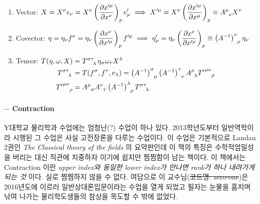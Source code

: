 \documentclass[paper=a4, fontsize=11pt]{scrartcl} %
\numberwithin{equation}{section} %
\numberwithin{figure}{section} %
\numberwithin{table}{section} %
\theoremstyle{plain}
\newcommand{\Hs}{\hspace{0.1cm}}
\newcommand{\PD}[2]{\frac{\partial #1}{\partial #2}}
\newcommand{\BKS}[1]{\left( #1 \right)}
\begin{document}
\begin{enumerate}
 \item Vector: \Hs $\begin{aligned}[t]
                     X = X^{\nu}e_{\nu} = X^{\nu} \BKS{\PD{x'^{\mu}}{x^{\nu}}}_p e'_\mu \Hs \Longrightarrow \Hs X'^{\mu} = X^{\nu}\BKS{\PD{x'^{\mu}}{x^{\mu}}}_p \equiv \tensor{A}{^\mu _\nu}X^{\nu}
                    \end{aligned}$
 \item Covector: \Hs $\begin{aligned}[t]
                       \eta = \eta_{\nu} f^{\nu} = \eta_{\nu} \BKS{\PD{x^{\nu}}{x'^{\mu}}}_p f'^{\mu} \Hs \Longrightarrow \Hs \eta'_{\mu} = \eta_{\nu} \BKS{\PD{x^{\nu}}{x'^{\mu}}}_p \equiv \tensor{\BKS{A^{-1}}}{^\nu _\mu}\eta_{\nu}
                      \end{aligned}$
 \item Tensor: \Hs $\begin{aligned}[t]
                     T(\eta,\omega,X) & = \tensor{T}{^\sigma^\tau_\lambda} \eta_\sigma \omega_{\tau} X^{\lambda}\\
                     \tensor{T}{^\sigma ^\tau _\lambda} & = T(f^\sigma, f^\tau,e_\lambda) = \tensor{\BKS{A^{-1}}}{^\sigma _\mu} \tensor{\BKS{A^{-1}}}{^\tau _\nu} \tensor{A}{^\rho _\lambda} \tensor{{T'}}{ ^\mu ^\nu _\rho} \\
                     \tensor{{T'}}{^\mu ^\nu _\rho} & = \tensor{A}{^\mu _\sigma} \tensor{A}{^\nu _\tau} \tensor{\BKS{A^{-1}}}{^\lambda _\rho} \tensor{T}{^\sigma^\tau_\lambda} 
                    \end{aligned}$


\end{enumerate}


\paragraph{$-$ Contraction}

Y대학교 물리학과 수업에는 엄청난(?) 수업이 하나 있다. 2013학년도부터 일반역학이라 시행된 그 수업은 사실 고전장론을 다루는 수업이다.\footnotemark
{}
이 수업은 기본적으로 Landau 2권인 \emph{The Classical theory of the fields} 의 요약판인데 이 책의 특징은 수학적엄밀성을 버리는 대신 직관에 치중하자 이기에 
쉽지만 찜찜함이 남는 책이다. 이 책에서는 Contraction 이란 \textit{upper index와 동일한 lower index가 만나면 rank가 하나 내려가게 되는 것} 이다. 실로 찜찜하지 않을 수 없다.
여담으로 이 교수님(\sout{코드명: zero-one})은 2016년도에 이르러 일반상대론입문이라는 수업을 열게 되었고 필자는 눈물을 훔치며 낚여 나가는 물리학도생들의 참상을 목도할 수 밖에 없었다. \footnotemark 
{}
\end{document}
